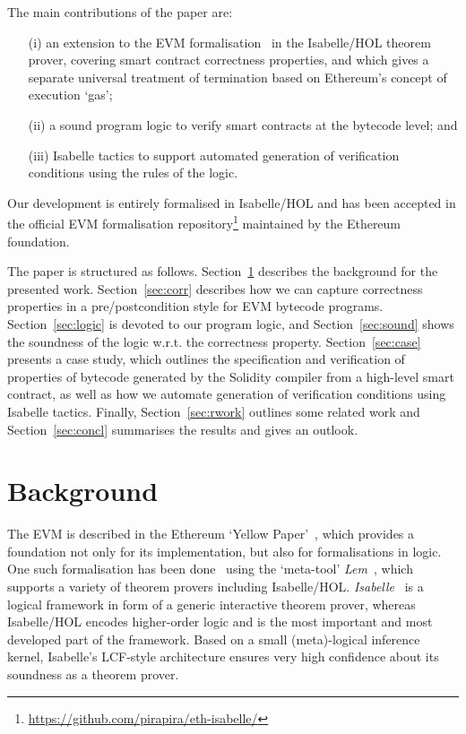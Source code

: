 \documentclass[sigplan,10pt]{acmart}\settopmatter{printfolios=true,printccs=false,printacmref=false}
\begin{document}
The main contributions of the paper are:
\begin{itemize}
\item[(i)] an extension to the EVM formalisation~\cite{Yoichi} in the Isabelle/HOL theorem prover,
           covering smart contract correctness properties, and which gives a separate universal
           treatment of termination based on Ethereum's concept of execution `gas';
\item[(ii)] a sound program logic to verify smart contracts at the bytecode level; and
\item[(iii)] Isabelle tactics to support automated generation of verification
            conditions using the rules of the logic.
\end{itemize}

Our development is entirely formalised in Isabelle/HOL and has
been accepted in the official EVM
formalisation repository\footnote{\url{https://github.com/pirapira/eth-isabelle/}} maintained by the Ethereum foundation.

The paper is structured as follows. Section~\ref{sec:bg} describes the background
for the presented work. Section~\ref{sec:corr} describes how we can capture correctness properties in a pre/postcondition
style for EVM bytecode programs. Section~\ref{sec:logic} is devoted to our program logic, 
and Section~\ref{sec:sound} shows the soundness of the logic
w.r.t. the correctness property.
Section~\ref{sec:case} presents a case study, which outlines the 
specification and verification of properties of bytecode 
generated by the Solidity compiler from a high-level smart contract, 
as well as how we automate generation of verification conditions using Isabelle tactics.
Finally, Section~\ref{sec:rwork} outlines some related work and
Section~\ref{sec:concl} summarises the results and gives an outlook.
%
\section{Background} 
\label{sec:bg}
The EVM is described in the Ethereum `Yellow Paper'~\cite{wood2014ethereum},
which provides a %
foundation not only for its implementation, but also for formalisations in logic.
One such formalisation has been done~\cite{Yoichi} using the `meta-tool' \emph{Lem}~\cite{DBLP:conf/icfp/MulliganOGRS14},
which supports a variety of theorem provers including Isabelle/HOL.
\emph{Isabelle}~\cite{Nipkow_PW:Isabelle} is a logical framework in form of a generic interactive theorem prover, whereas
Isabelle/HOL encodes higher-order logic and is the most important and most developed part of the framework.
Based on a small (meta)-logical inference kernel, Isabelle's LCF-style architecture
ensures very high confidence about its soundness as a theorem prover.
 
\end{document}
